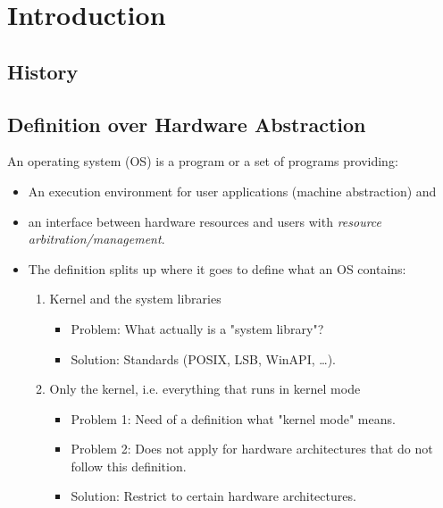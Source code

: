 \chapter{Introduction}
    \section{History} %

    \section{Definition over Hardware Abstraction}
        An operating system (OS) is a program or a set of programs providing:
        \begin{itemize}
        	\item An execution environment for user applications (machine abstraction) and
        	\item an interface between hardware resources and users with \textit{resource arbitration/management}.
        	\item The definition splits up where it goes to define what an OS contains:
            	\begin{enumerate}
            		\item Kernel and the system libraries
	            		\begin{itemize}
	            			\item Problem: What actually is a "system library"?
	            			\item Solution: Standards (POSIX, LSB, WinAPI, \dots).
	            		\end{itemize}
            		\item Only the kernel, i.e. everything that runs in kernel mode
	            		\begin{itemize}
	            			\item Problem 1: Need of a definition what "kernel mode" means.
	            			\item Problem 2: Does not apply for hardware architectures that do not follow this definition.
	            			\item Solution: Restrict to certain hardware architectures.
	            		\end{itemize}
            	\end{enumerate}
        \end{itemize}

